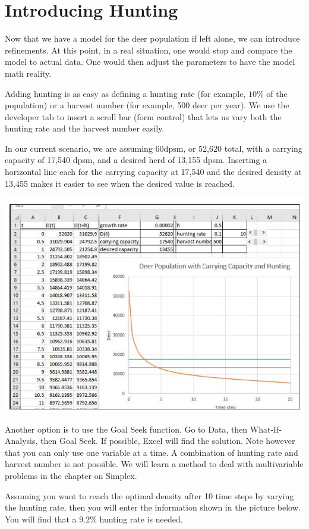 \documentclass[10pt]{article}
\begin{document}
\section{Introducing Hunting}
Now that we have a model for the deer population if left alone, we can introduce refinements. At this point, in a real situation, one would stop and compare the model to actual data. One would then adjust the parameters to have the model math reality.

Adding hunting is as easy as defining a hunting rate (for example, $10 \%$ of the population) or a harvest number (for example, 500 deer per year). We use the developer tab to insert a scroll bar (form control) that lets us vary both the hunting rate and the harvest number easily.

In our current scenario, we are assuming $60 \mathrm{dpsm}$, or 52,620 total, with a carrying capacity of 17,540 dpsm, and a desired herd of 13,155 dpsm. Inserting a horizontal line each for the carrying capacity at 17,540 and the desired density at 13,455 makes it easier to see when the desired value is reached.

\includegraphics[max width=\textwidth]{2022_07_05_5945264bba2a5f6ba667g-13}

Another option is to use the Goal Seek function. Go to Data, then What-If-Analysis, then Goal Seek. If possible, Excel will find the solution. Note however that you can only use one variable at a time. A combination of hunting rate and harvest number is not possible. We will learn a method to deal with multivariable problems in the chapter on Simplex.

Assuming you want to reach the optimal density after 10 time steps by varying the hunting rate, then you will enter the information shown in the picture below. You will find that a $9.2 \%$ hunting rate is needed.
\end{document}
